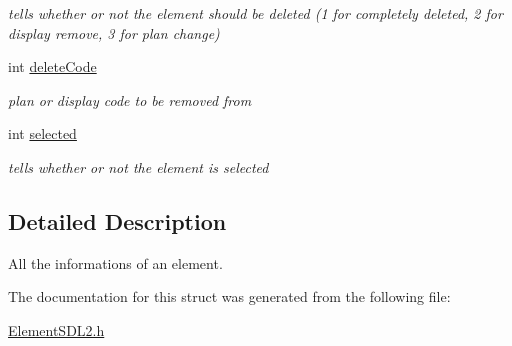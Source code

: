 \begin{DoxyCompactItemize}
\begin{DoxyCompactList}\small\item\em tells whether or not the element should be deleted (1 for completely deleted, 2 for display remove, 3 for plan change) \end{DoxyCompactList}\item 
int \hyperlink{structElementSDL2_a1f8620d697afd711263d20dd82077cd0}{delete\+Code}\hypertarget{structElementSDL2_a1f8620d697afd711263d20dd82077cd0}{}\label{structElementSDL2_a1f8620d697afd711263d20dd82077cd0}

\begin{DoxyCompactList}\small\item\em plan or display code to be removed from \end{DoxyCompactList}\item 
int \hyperlink{structElementSDL2_a2cae92fe5dd207db485261128b82bc02}{selected}\hypertarget{structElementSDL2_a2cae92fe5dd207db485261128b82bc02}{}\label{structElementSDL2_a2cae92fe5dd207db485261128b82bc02}

\begin{DoxyCompactList}\small\item\em tells whether or not the element is selected \end{DoxyCompactList}\end{DoxyCompactItemize}


\subsection{Detailed Description}
All the informations of an element. 

The documentation for this struct was generated from the following file\+:\begin{DoxyCompactItemize}
\item 
\hyperlink{ElementSDL2_8h}{Element\+S\+D\+L2.\+h}\end{DoxyCompactItemize}
